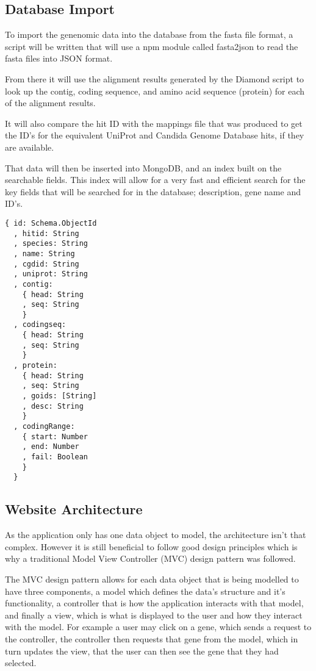 \subsection{Database Import}
To import the genenomic data into the database from the fasta file format, a script will be written that will use a npm module called fasta2json\cite{fasta2json} to read the fasta files into JSON format. 

From there it will use the alignment results generated by the Diamond script to look up the contig, coding sequence, and amino acid sequence (protein) for each of the alignment results. 

It will also compare the hit ID with the mappings file that was produced to get the ID's for the equivalent UniProt and Candida Genome Database hits, if they are available. 

That data will then be inserted into MongoDB, and an index built on the searchable fields. This index will allow for a very fast and efficient search for the key fields that will be searched for in the database; description, gene name and ID's.

\begin{lstlisting}[caption=The database schema that will represent a gene in the database.]
  { id: Schema.ObjectId
  , hitid: String
  , species: String
  , name: String
  , cgdid: String
  , uniprot: String
  , contig: 
    { head: String
    , seq: String 
    }
  , codingseq: 
    { head: String
    , seq: String 
    }
  , protein: 
    { head: String
    , seq: String
    , goids: [String]
    , desc: String 
    }
  , codingRange: 
    { start: Number
    , end: Number
    , fail: Boolean 
    }
  }
\end{lstlisting}

    
\subsection{Website Architecture}
As the application only has one data object to model, the architecture isn't that complex. However it is still beneficial to follow good design principles which is why a traditional Model View Controller (MVC) design pattern\cite{mvc} was followed. 

The MVC design pattern allows for each data object that is being modelled to have three components, a model which defines the data's structure and it's functionality, a controller that is how the application interacts with that model, and finally a view, which is what is displayed to the user and how they interact with the model. For example a user may click on a gene, which sends a request to the controller, the controller then requests that gene from the model, which in turn updates the view, that the user can then see the gene that they had selected. 

